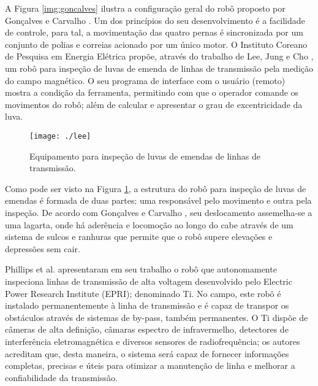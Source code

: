 A Figura \ref{img:goncalves} ilustra a configuração geral do robô proposto por Gonçalves e Carvalho \cite{gonccalves2006kinematics} \cite{goncalves2010graphical}. Um dos princípios do seu desenvolvimento é a  facilidade de controle, para tal, a movimentação das quatro pernas é sincronizada por um conjunto de polias e correias acionado por um único motor. 
O Instituto Coreano de Pesquisa em Energia Elétrica propõe, através do trabalho de Lee, Jung e Cho \cite{lee2011development}, um robô para inspeção de luvas de emenda de linhas de transmissão pela medição do campo magnético. O seu programa de interface com o usuário (remoto) mostra a condição da ferramenta, permitindo com que o operador comande os movimentos do robô; além de calcular e apresentar o grau de excentricidade da luva.  

\begin{figure} [h!]	
	\caption{Equipamento para inspeção de luvas de emendas de linhas de transmissão.}
	\label{img:lee}											 
	\centering													 
	\texttt{[image: ./lee]}
\end{figure}													 

Como pode ser visto na Figura \ref{img:lee}, a estrutura do robô para inspeção de luvas de emendas é formada de duas partes: uma responsável pelo movimento e outra pela inspeção. De acordo com Gonçalves e Carvalho \cite{gonccalves2013review}, seu deslocamento assemelha-se a uma lagarta, onde há aderência e locomoção ao longo do cabe através de um sistema de sulcos e ranhuras que permite que o robô supere elevações e depressões sem cair.

Phillips et al. \cite{phillips2012autonomous} apresentaram em seu trabalho o robô que autonomamente inspeciona linhas de transmissão de alta voltagem desenvolvido pelo Electric Power Research Institute (EPRI); denominado Ti. No campo, este robô é instalado permanentemente à linha de transmissão e é capaz de transpor os obstáculos através de sistemas de by-pass, também permanentes. O Ti dispõe de câmeras de alta definição, câmaras espectro de infravermelho, detectores de interferência eletromagnética e diversos sensores de radiofrequência; os autores acreditam que, desta maneira, o sistema será capaz de fornecer informações completas, precisas e úteis para otimizar a manutenção de linha e melhorar a confiabilidade da transmissão. 

